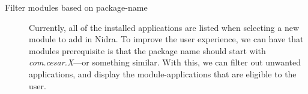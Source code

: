 \begin{description}
    \item[Filter modules based on package-name] Currently, all of the installed applications are listed when selecting a new module to add in Nidra. To improve the user experience, we can have that modules prerequisite is that the package name should start with \textit{com.cesar.X}---or something similar. With this, we can filter out unwanted applications, and display the module-applications that are eligible to the user.
\end{description}